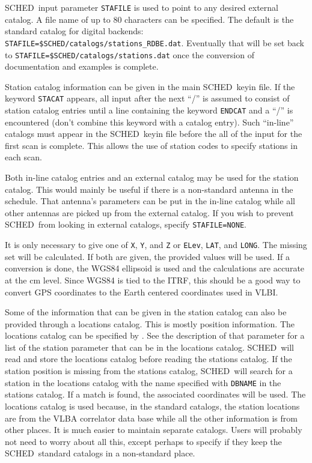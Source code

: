 \documentclass{report}
\newcommand{\schedb}{{\sc SCHED~}}
\begin{document}
\schedb input parameter {\tt STAFILE} is used to point to any desired
external catalog.  A file name of up to 80 characters can be
specified. The default is the standard catalog for digital backends:
\\ {\tt STAFILE=\$SCHED/catalogs/stations\_RDBE.dat}.  Eventually that
will be set back to {\tt STAFILE=\$SCHED/catalogs/stations.dat} once
the conversion of documentation and examples is complete.

Station catalog information can be given in the main \schedb keyin
file. If the keyword {\tt STACAT} appears, all input after the next
``/'' is assumed to consist of station catalog entries until a line
containing the keyword {\tt ENDCAT} and a ``/'' is encountered (don't
combine this keyword with a catalog entry).  Such ``in-line'' catalogs
must appear in the \schedb keyin file before the all of the input
for the first scan is complete.  This allows the use of station codes
to specify stations in each scan.

Both in-line catalog entries and an external catalog may be used for
the station catalog.  This would mainly be useful if there is a
non-standard antenna in the schedule.  That antenna's parameters can
be put in the in-line catalog while all other antennas are picked up
from the external catalog.  If you wish to prevent \schedb from
looking in external catalogs, specify {\tt STAFILE=NONE}.

It is only necessary to give one of {\tt X}, {\tt Y}, and {\tt Z} or
{\tt ELev}, {\tt LAT}, and {\tt LONG}.  The missing set will be
calculated.  If both are given, the provided values will be used.  If
a conversion is done, the WGS84 ellipsoid is used and the calculations
are accurate at the cm level.  Since WGS84 is tied to the ITRF, this
should be a good way to convert GPS coordinates to the Earth centered
coordinates used in VLBI.

Some of the information that can be given in the station catalog can
also be provided through a locations catalog.  This is mostly position
information.  The locations catalog can be specified by .  See the description of that parameter for a
list of the station parameter that can be in the locations catalog.
\schedb will read and store the locations catalog before reading the
stations catalog.  If the station position is missing from the
stations catalog, \schedb will search for a station in the locations
catalog with the name specified with {\tt DBNAME} in the stations
catalog.  If a match is found, the associated coordinates will be
used.  The locations catalog is used because, in the standard
catalogs, the station locations are from the VLBA correlator data base
while all the other information is from other places.  It is much
easier to maintain separate catalogs.  Users will probably not need to
worry about all this, except perhaps to specify  if they keep the \schedb standard catalogs in a
non-standard place.
\end{document}
